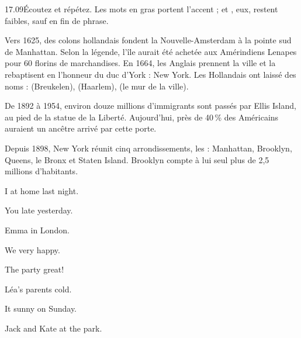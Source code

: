 \begin{phrases}{17.09}{Écoutez et répétez. Les mots en gras portent l'accent ;  et ,
eux, restent faibles, sauf en fin de phrase.}
\end{phrases}


\begin{culture}
Vers 1625, des colons hollandais fondent la Nouvelle-Amsterdam à la pointe sud de Manhattan. Selon la
légende, l'île aurait été achetée aux Amérindiens Lenapes pour 60 florins de marchandises. En 1664, les
Anglais prennent la ville et la rebaptisent en l'honneur du duc d'York : New York. Les Hollandais ont
laissé des noms :  (Breukelen),  (Haarlem),  (le mur de la
ville).
\end{culture}

\begin{paire}
\begin{culture}
De 1892 à 1954, environ douze millions d'immigrants sont passés par Ellis Island, au pied de la statue
de la Liberté. Aujourd'hui, près de 40\,\% des Américains auraient un ancêtre arrivé par cette porte.
\end{culture}
\begin{culture}
Depuis 1898, New York réunit cinq arrondissements, les  : Manhattan, Brooklyn, Queens, le
Bronx et Staten Island. Brooklyn compte à lui seul plus de 2,5 millions d'habitants.
\end{culture}
\end{paire}


\begin{anglais}
\begin{questions}[2]
\item I  at home last night.
\item You  late yesterday.
\item Emma  in London.
\item We  very happy.
\item The party  great!
\item Léa's parents  cold.
\item It  sunny on Sunday.
\item Jack and Kate  at the park.
\end{questions}
\end{anglais}

